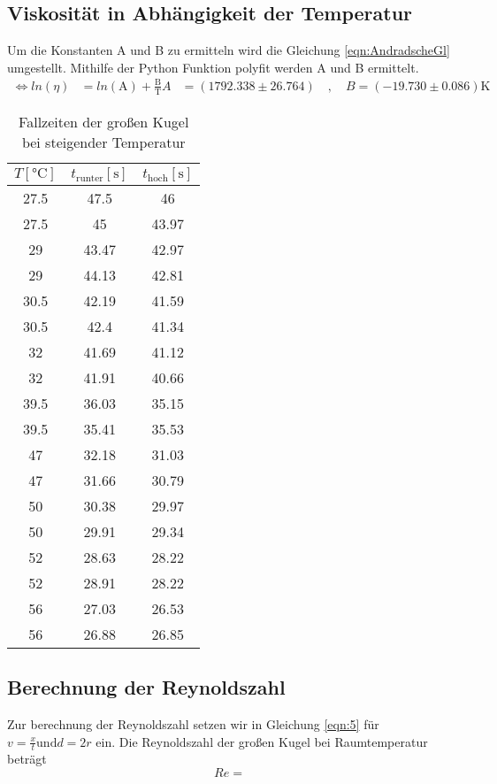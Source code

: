\subsection{Viskosität in Abhängigkeit der Temperatur}
Um die Konstanten A und B zu ermitteln wird die Gleichung \eqref{eqn:AndradscheGl} umgestellt.
Mithilfe der Python Funktion polyfit werden A und B ermittelt.
\begin{align}
  \Leftrightarrow ln(η) &= ln(\text{A}) + \frac{\text{B}}{\text{T}}
  A &= (1792.338 ± 26.764) \quad , \quad B = (-19.730 ± 0.086)\si{\kelvin}
\end{align}
\begin{table}[!htp]
  \centering
  \begin{tabular}{c|c|c}
    \toprule
    $T [\unit{\degreeCelsius}]$ & $t_{\text{runter}} [\unit{\second}]$ & $t_{\text{hoch}} [\unit{\second}]$\\
    \midrule
    27.5 & 47.5 & 46\\%
    27.5 & 45 & 43.97\\
    29 & 43.47 & 42.97\\
    29 & 44.13 & 42.81\\
    30.5 & 42.19 & 41.59\\
    30.5 & 42.4 & 41.34\\
    32 & 41.69 & 41.12\\
    32 & 41.91 & 40.66\\
    39.5 & 36.03 & 35.15\\
    39.5 & 35.41 & 35.53\\
    47 & 32.18 & 31.03\\
    47 & 31.66 & 30.79\\
    50 & 30.38 & 29.97\\
    50 & 29.91 & 29.34\\
    52 & 28.63 & 28.22\\
    52 & 28.91 & 28.22\\
    56 & 27.03 & 26.53\\
    56 & 26.88 & 26.85\\
    \bottomrule
  \end{tabular}
  \label{tabellegkt}
  \caption{Fallzeiten der großen Kugel bei steigender Temperatur}
\end{table}

\subsection{Berechnung der Reynoldszahl}
Zur berechnung der Reynoldszahl setzen wir in Gleichung \eqref{eqn:5} für $v = \frac{x}{t} \text{und} d = 2r$ ein.
Die Reynoldszahl der großen Kugel bei Raumtemperatur beträgt
\begin{equation}
  Re = 
\end{equation} 


